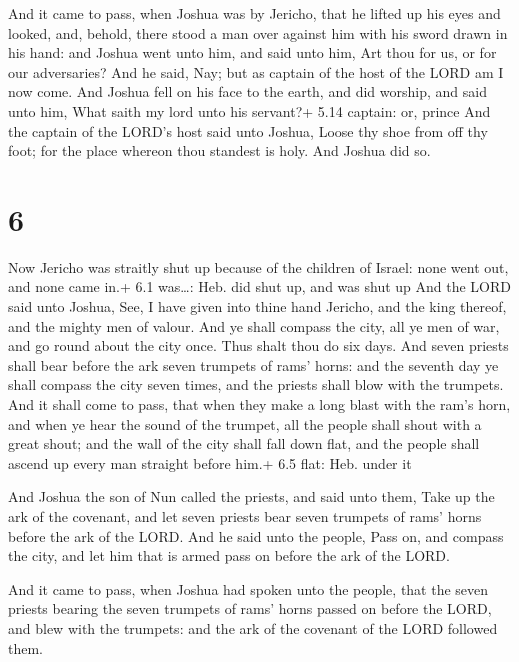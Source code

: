  And it came to pass, when Joshua was by Jericho, that he
lifted up his eyes and looked, and, behold, there stood a man over
against him with his sword drawn in his hand: and Joshua went unto him,
and said unto him, Art thou for us, or for our adversaries?
 And he said, Nay; but as captain of the host of the LORD
am I now come. And Joshua fell on his face to the earth, and did
worship, and said unto him, What saith my lord unto his servant?+ 5.14
captain: or, prince  And the captain of the LORD's host
said unto Joshua, Loose thy shoe from off thy foot; for the place
whereon thou standest is holy. And Joshua did so.

\hypertarget{section-5}{%
\section{6}\label{section-5}}

 Now Jericho was straitly shut up because of the children of
Israel: none went out, and none came in.+ 6.1 was\ldots: Heb. did shut
up, and was shut up  And the LORD said unto Joshua, See, I
have given into thine hand Jericho, and the king thereof, and the mighty
men of valour.  And ye shall compass the city, all ye men of
war, and go round about the city once. Thus shalt thou do six days.
 And seven priests shall bear before the ark seven trumpets
of rams' horns: and the seventh day ye shall compass the city seven
times, and the priests shall blow with the trumpets.  And it
shall come to pass, that when they make a long blast with the ram's
horn, and when ye hear the sound of the trumpet, all the people shall
shout with a great shout; and the wall of the city shall fall down flat,
and the people shall ascend up every man straight before him.+ 6.5 flat:
Heb. under it

 And Joshua the son of Nun called the priests, and said
unto them, Take up the ark of the covenant, and let seven priests bear
seven trumpets of rams' horns before the ark of the LORD. 
And he said unto the people, Pass on, and compass the city, and let him
that is armed pass on before the ark of the LORD.

 And it came to pass, when Joshua had spoken unto the
people, that the seven priests bearing the seven trumpets of rams' horns
passed on before the LORD, and blew with the trumpets: and the ark of
the covenant of the LORD followed them.

